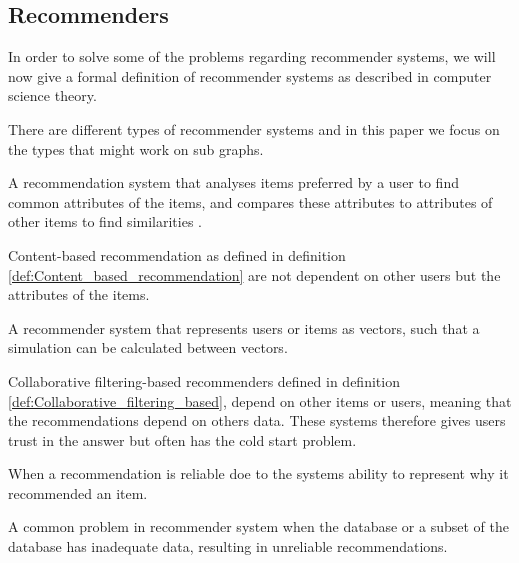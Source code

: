 \subsection{Recommenders}
In order to solve some of the problems regarding recommender systems, we will now give a formal definition of recommender systems as described in computer science theory. 

There are different types of recommender systems and in this paper we focus on the types that might work on sub graphs.

\begin{definition} \label{def:Content_based_recommendation}
A recommendation system that analyses items preferred by a user to find common attributes of the items, and compares these attributes to attributes of other items to find similarities \cite{lu2015recommender}. 
\end{definition}

Content-based recommendation as defined in definition  \autoref{def:Content_based_recommendation} are not dependent on other users but the attributes of the items.

\begin{definition}\label{def:Collaborative_filtering_based}
A recommender system that represents users or items as vectors, such that a simulation can be calculated between vectors\cite{lu2015recommender}.
\end{definition}

Collaborative filtering-based recommenders defined in definition \autoref{def:Collaborative_filtering_based}, depend on other items or users, meaning that the recommendations depend on others data. These systems therefore gives users trust in the answer but often has the cold start problem.

\begin{definition}[Trust]\label{def:trust}
When a recommendation is reliable doe to the systems ability to represent why it recommended an item.
\end{definition}

\begin{definition}\label{def:cold_start_problem}
A common problem in recommender system when the database or a subset of the database has inadequate data, resulting in unreliable recommendations.
\end{definition}